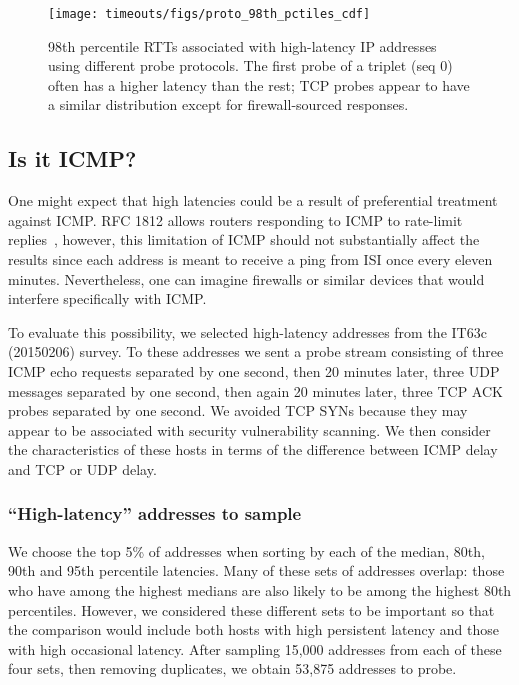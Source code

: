 
\begin{figure}[tb]
\begin{center}
\texttt{[image: timeouts/figs/proto\_98th\_pctiles\_cdf]}
\end{center}
\caption{\label{fig:icmp_vs_udp_vs_tcp}%
98th percentile RTTs associated with high-latency IP addresses using different probe protocols.  The first probe of a triplet (seq 0) often has a higher latency than the rest; TCP probes appear to have a similar distribution except for firewall-sourced responses.}
\end{figure}

\subsection{Is it ICMP?}

One might expect that high latencies could be a result of
preferential treatment against ICMP.
RFC 1812 allows routers responding to ICMP to rate-limit
replies~\cite{rfc1812,ipmp}, however, this limitation of ICMP
should not substantially affect the results since each
address is meant to receive a ping from ISI once every
eleven minutes. Nevertheless, one can imagine firewalls or
similar devices that would interfere specifically with ICMP.

To evaluate this possibility, we selected high-latency
addresses from the IT63c (20150206) survey.  To these
addresses we sent a probe stream consisting of three ICMP
echo requests separated by one second, then 20 minutes
later, three UDP messages separated by one second, then
again 20 minutes later, three TCP ACK probes separated by one
second.
We avoided TCP SYNs
because they may appear to be associated with security 
vulnerability scanning.
We then consider the characteristics of these hosts
in terms of the difference between ICMP delay and TCP or UDP
delay.

\subsubsection*{``High-latency'' addresses to sample}

We choose the top 5\% of addresses when sorting by each of
the median, 80th, 90th and 95th percentile latencies.  Many
of these sets of addresses overlap: those who have among the
highest medians are also likely to be among the highest 80th
percentiles.  However, we considered these different sets to
be important so that the comparison would include both hosts
with high persistent latency and those with high occasional
latency.  After sampling 15,000 addresses from each of these four
sets, then removing duplicates, we obtain 53,875 addresses to probe. 

